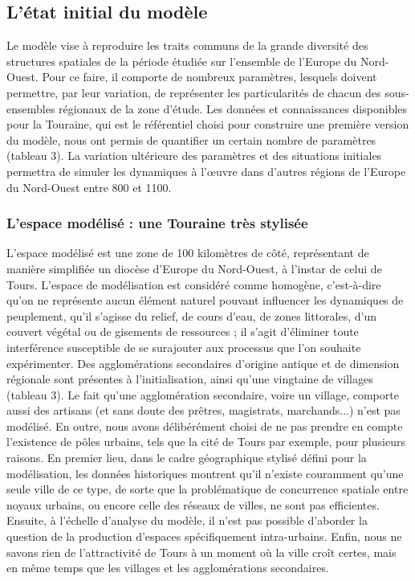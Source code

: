 \documentclass[12pt, a4paper, oneside]{book}
\begin{document}
	\subsection{L'état initial du modèle}
	
	Le modèle vise à reproduire les traits communs de la grande diversité des structures spatiales de la période étudiée sur l'ensemble de l'Europe du Nord-Ouest.
	Pour ce faire, il comporte de nombreux paramètres, lesquels doivent permettre, par leur variation, de représenter les particularités de chacun des sous-ensembles régionaux de la zone d'étude.
	Les données et connaissances disponibles pour la Touraine, qui est le référentiel choisi pour construire une première version du modèle, nous ont permis de quantifier un certain nombre de paramètres (tableau 3).
	La variation ultérieure des paramètres et des situations initiales permettra de simuler les dynamiques à l'œuvre dans d'autres régions de l'Europe du Nord-Ouest entre 800 et 1100.
	
	\subsubsection{L'espace modélisé : une Touraine très stylisée}
	
	L'espace modélisé est une zone de 100 kilomètres de côté, représentant de manière simplifiée un diocèse d'Europe du Nord-Ouest, à l'instar de celui de Tours.
	L'espace de modélisation est considéré comme homogène, c'est-à-dire qu'on ne représente aucun élément naturel pouvant influencer les dynamiques de peuplement, qu'il s'agisse du relief, de cours d'eau, de zones littorales, d'un couvert végétal ou de gisements de ressources ;
	il s'agit d'éliminer toute interférence susceptible de se surajouter aux processus que l'on souhaite expérimenter.
	Des agglomérations secondaires d'origine antique et de dimension régionale sont présentes à l'initialisation, ainsi qu'une vingtaine de villages (tableau 3).
	Le fait qu'une agglomération secondaire, voire un village, comporte aussi des artisans (et sans doute des prêtres, magistrats, marchands...) n'est pas modélisé.
	En outre, nous avons délibérément choisi de ne pas prendre en compte l'existence de pôles urbains, tels que la cité de Tours par exemple, pour plusieurs raisons.
	En premier lieu, dans le cadre géographique stylisé défini pour la modélisation, les données historiques montrent qu'il n'existe couramment qu'une seule ville de ce type, de sorte que la problématique de concurrence spatiale entre noyaux urbains, ou encore celle des réseaux de villes, ne sont pas efficientes.
	Ensuite, à l'échelle d'analyse du modèle, il n'est pas possible d'aborder la question de la production d'espaces spécifiquement intra-urbains.
	Enfin, nous ne savons rien de l'attractivité de Tours à un moment où la ville croît certes, mais en même temps que les villages et les agglomérations secondaires.
	
\end{document}
